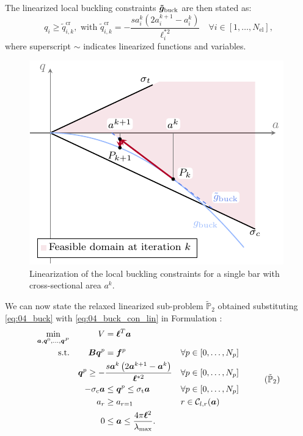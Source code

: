 The linearized local buckling constraints $\bm{\tilde{g}}_{\textrm{buck}}$ are then stated as:
\begin{equation}
    q_{i} \geq \tilde{q}^{\text{cr}}_{i,k},\text{ with } \tilde{q}^{\text{cr}}_{i,k}= - \frac{s a_{i}^k\left(2 a_{i}^{k+1} - a_{i}^k\right)}{\ell^{*2}_i} \quad \forall i \in [1,\ldots, N_{\text{el}}],
    \label{eq:04_buck_con_lin}
\end{equation}
where superscript $\sim$ indicates linearized functions and variables.

\begin{figure}
    \centering
    \includegraphics[width=0.7\linewidth]{figures/04_TTO_improvements/03_SLP/slp.pdf}
    \caption{Linearization of the local buckling constraints for a single bar with cross-sectional area $a^k$.}
    \label{fig:04_SLP}
\end{figure}


We can now state the relaxed linearized sub-problem $\tilde{\mathbb{P}}_2$ obtained substituting \eqref{eq:04_buck} with \eqref{eq:04_buck_con_lin} in Formulation :
\begin{equation}
    \begin{aligned}
    \min_{\vect{a}, \vect{q}^0, \dots, \vect{q}^P}   && V &= \vect{\ell}^{T}\vect{a}\\
    \textrm{s.t.}   && \matr{B}\vect{q}^p &= \vect{f}^p && \forall p \in [0,\dots,N_p]\\
    && \vect{q}^p \geq - &\frac{s \vect{a}^k\left(2 \vect{a}^{k+1} - \vect{a}^k\right)}{\vect{\ell}^{*2}} && \forall p \in [0,\dots,N_p] \\
    && -\sigma_\text{c}\vect{a} &\leq \vect{q}^p \leq \sigma_\text{t}\vect{a} && \forall p \in [0,\dots,N_p] \\
    && a_{r}&\geq a_{r=1} && r \in \mathcal{C}_{l,r}(\vect{a}) \\
    && 0 &\leq \vect{a} \leq \frac{4 \pi \vect{\ell}^2}{\lambda_{\text{max}}}. \\
    \end{aligned}
    \tag{$\tilde{\mathbb{P}}_2$}
    \label{eq:04_optim_no_constr_lp}
\end{equation}

